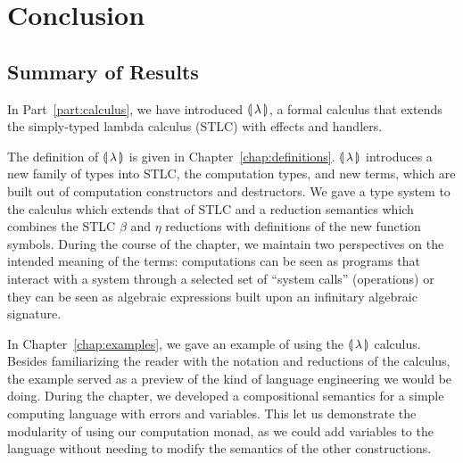 \chapter{Conclusion}
\label{chap:conclusion}

\section{Summary of Results}
\label{sec:summary}

In Part~\ref{part:calculus}, we have introduced ${\llparenthesis \, \lambda \, \rrparenthesis}$, a formal calculus
that extends the simply-typed lambda calculus (STLC) with effects and
handlers.

The definition of ${\llparenthesis \, \lambda \, \rrparenthesis}$ is given in
Chapter~\ref{chap:definitions}. ${\llparenthesis \, \lambda \, \rrparenthesis}$ introduces a new family of types
into STLC, the computation types, and new terms, which are built out of
computation constructors and destructors. We gave a type system to the
calculus which extends that of STLC and a reduction semantics which
combines the STLC $\beta$ and $\eta$ reductions with definitions of the new
function symbols. During the course of the chapter, we maintain two
perspectives on the intended meaning of the terms: computations can be seen
as programs that interact with a system through a selected set of ``system
calls'' (operations) or they can be seen as algebraic expressions built
upon an infinitary algebraic signature.

In Chapter~\ref{chap:examples}, we gave an example of using the ${\llparenthesis \, \lambda \, \rrparenthesis}$
calculus. Besides familiarizing the reader with the notation and reductions
of the calculus, the example served as a preview of the kind of language
engineering we would be doing. During the chapter, we developed a
compositional semantics for a simple computing language with errors and
variables. This let us demonstrate the modularity of using our computation
monad, as we could add variables to the language without needing to modify
the semantics of the other constructions.


